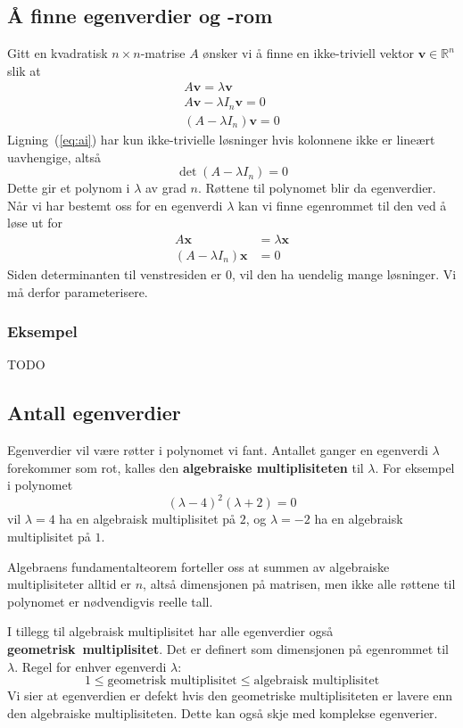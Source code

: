 \documentclass[12pt,a4paper,norsk]{article}
\newcommand{\R}{\mathbb{R}}
\newcommand{\nullvec}{0}
\newcommand{\nullmat}{0}
\newcommand{\vv}{\textbf{v}}
\newcommand{\vx}{\textbf{x}}
\begin{document}
\subsection{Å finne egenverdier og -rom}
Gitt en kvadratisk $n \times n$-matrise $A$ ønsker vi å finne en ikke-triviell vektor $\vv \in \R^{n}$
slik at
\begin{align}
  A\vv = \lambda \vv \\
  A\vv - \lambda I_{n} \vv = \nullvec \\
  (A - \lambda I_{n})\vv = \nullmat \label{eq:ai}
\end{align}
Ligning~(\ref{eq:ai}) har kun ikke-trivielle løsninger hvis kolonnene ikke er
lineært uavhengige, altså
\[\det (A-\lambda I_{n}) = 0\]
Dette gir et polynom i $\lambda$ av grad $n$. Røttene til polynomet blir da
egenverdier. Når vi har bestemt oss for en egenverdi $\lambda$ kan vi finne egenrommet til
den ved å løse ut for
\begin{align*}
  A\vx &= \lambda \vx \\
  (A - \lambda I_{n})\vx &= 0
\end{align*}
Siden determinanten til venstresiden er 0, vil den ha uendelig mange løsninger.
Vi må derfor parameterisere.

\subsubsection{Eksempel}
TODO

\subsection{Antall egenverdier}
Egenverdier vil være røtter i polynomet vi fant. Antallet ganger en egenverdi
$\lambda$ forekommer som rot, kalles den \textbf{algebraiske multiplisiteten} til $\lambda$.
For eksempel i polynomet
\[{(\lambda - 4)}^{2}(\lambda + 2) = 0\]
vil $\lambda=4$ ha en algebraisk multiplisitet på $2$, og $\lambda=-2$ ha en algebraisk
multiplisitet på $1$.

Algebraens fundamentalteorem forteller oss at summen av algebraiske
multiplisiteter alltid er $n$, altså dimensjonen på matrisen, men ikke alle
røttene til polynomet er nødvendigvis reelle tall.

I tillegg til algebraisk multiplisitet har alle egenverdier også
\textbf{geometrisk~multiplisitet}. Det er definert som dimensjonen på egenrommet
til $\lambda$. Regel for enhver egenverdi $\lambda$:
\[1 \leq \text{geometrisk multiplisitet} \le \text{algebraisk multiplisitet}\]
Vi sier at egenverdien er defekt hvis den geometriske multiplisiteten er lavere
enn den algebraiske multiplisiteten. Dette kan også skje med komplekse
egenverier.
\end{document}
